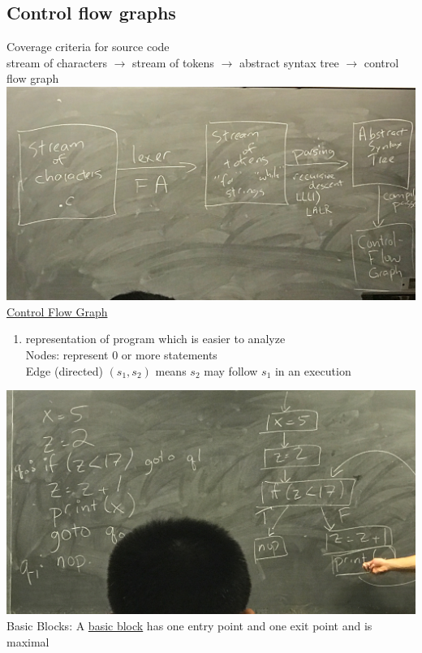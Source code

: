 \documentclass[10pt,usletter]{article}
\newcommand{\tab}[1][1cm]{\hspace*{#1}}
\begin{document}
\subsection*{Control flow graphs}
Coverage criteria for source code\\
stream of characters $\rightarrow$ stream of tokens $\rightarrow$ abstract syntax tree $\rightarrow$ control flow graph\\
\includegraphics[scale=0.1]{control_flow_graph_1}\\
\underline{Control Flow Graph}
\begin{enumerate}
\item representation of program which is easier to analyze\\
\tab Nodes: represent 0 or more statements\\
\tab Edge (directed) $(s_1, s_2)$ means $s_2$ may follow $s_1$ in an execution
\end{enumerate}


\includegraphics[scale=0.1]{control_flow_graph_2}\\

Basic Blocks: A \underline{basic block} has one entry point and one exit point and is maximal \\
\end{document}
